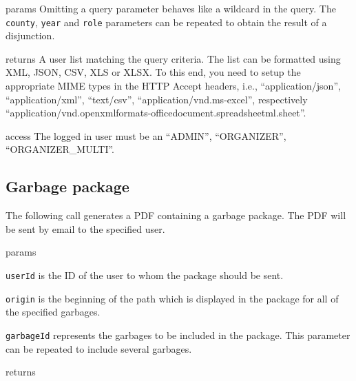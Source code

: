 \begin{apidata}{params}
  Omitting a query parameter behaves like a wildcard in the query. The
  \texttt{county}, \texttt{year} and \texttt{role} parameters can be repeated to
  obtain the result of a disjunction.
\end{apidata}
\begin{apidata}{returns}
  A user list matching the query criteria. The list can be formatted using XML,
  JSON, CSV, XLS or XLSX. To this end, you need to setup the appropriate MIME
  types in the HTTP Accept headers, i.e., ``application/json'',
  ``application/xml'', ``text/csv'', ``application/vnd.ms-excel'', respectively
  ``application/vnd.openxmlformats-officedocument.spreadsheetml.sheet''.
\end{apidata}
\begin{apidata}{access}
The logged in user must be an ``ADMIN'', ``ORGANIZER'', ``ORGANIZER\_MULTI''. 
\end{apidata}

\subsection{Garbage package}

The following call generates a PDF containing a garbage package. The PDF will be
sent by email to the specified user.

\begin{apidata}{params}
  \begin{datalist}
    \item \texttt{userId} is the ID of the user to whom the package should be
      sent.
    \item \texttt{origin} is the beginning of the path which is displayed in the
      package for all of the specified garbages.
    \item \texttt{garbageId} represents the garbages to be included in the
      package. This parameter can be repeated to include several garbages.
  \end{datalist}
\end{apidata}
\begin{apidata}{returns}
  \begin{datalist}
  \end{datalist}
\end{apidata}

